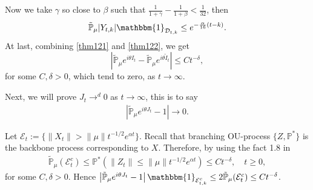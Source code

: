 \documentclass{article}
\begin{document}
Now we take $\gamma$ so close to $\beta$ such that $\frac{1}{1+\gamma}-\frac{1}{1+\beta}<\frac{1}{32}$, then 
\begin{align}
     \mathbb{\tilde{P}}_{\mu}|Y_{t,k}|\mathbbm{1}_{\mathcal{D}_{t,k}}\leq  e^{-\frac{\alpha}{16}(t-k)}.\label{thm122}
\end{align}
At last, combining \eqref{thm121} and \eqref{thm122}, we get 
$$\left|\mathbb{\tilde{P}}_{\mu}e^{i\theta I_t}-\mathbb{\tilde{P}}_{\mu}e^{i\theta\tilde{I}_t}\right|\leq C t^{-\delta},$$
for some $C,\delta>0$, which tend to zero, as $t\rightarrow \infty$.

Next, we will prove $J_t \rightarrow^d 0$ as $t\rightarrow \infty$, this is to say
\begin{align*}
    \left|\mathbb{\tilde{P}}_{\mu}e^{i\theta J_t}-1\right|\rightarrow 0.
\end{align*}

Let $\mathcal{E}_t:=\{\|X_t\|>\|\mu\|t^{-1/2}e^{\alpha t}\}$. Recall that branching OU-process $\{Z,\mathbb{P}^{\ast}\}$ is the backbone process corresponding to $X$. Therefore, by using the fact 1.8 in \cite{MM}
\begin{align}
    \mathbb{\tilde{P}}_{\mu}(\mathcal{E}^c_t)\leq\mathbb{P}^{\ast}(\|Z_t\|\leq\|\mu\|t^{-1/2}e^{\alpha t})\leq C t^{-\delta}, \quad t\geq0,\label{Theorem123}
\end{align}
for some $C,\delta>0$. Hence $\left|\mathbb{\tilde{P}}_{\mu}e^{i\theta J_t}-1\right|\mathbbm{1}_{\mathcal{E}^c_{t,k}}\leq 2\mathbb{\tilde{P}}_{\mu}(\mathcal{E}^c_t)\leq Ct^{-\delta}$.
\end{document}
